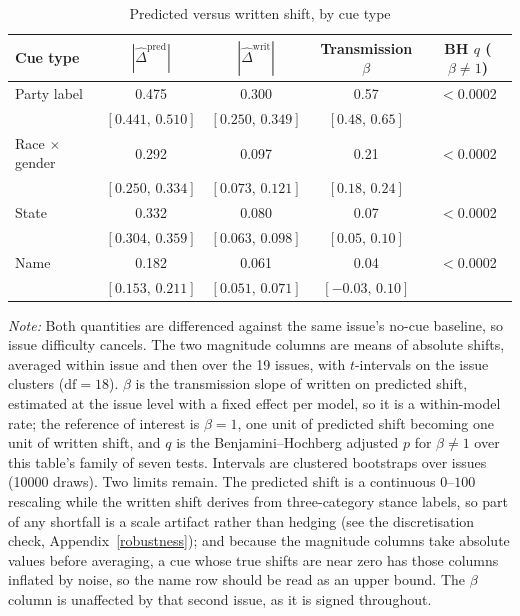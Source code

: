 \begin{table}[H]
\centering
\caption{Predicted versus written shift, by cue type}
\label{tab:predwrite}
\small
\setlength{\tabcolsep}{9pt}
\begin{tabular}{lcccc}
\toprule
\textbf{Cue type} & $|\widehat{\Delta}^{\text{pred}}|$ & $|\widehat{\Delta}^{\text{writ}}|$ & \textbf{Transmission} $\beta$ & BH $q$ ($\beta \neq 1$) \\
\midrule
Party label & 0.475 & 0.300 & 0.57 & $<$0.0002 \\
 & \scriptsize $[0.441,\,0.510]$ & \scriptsize $[0.250,\,0.349]$ & \scriptsize $[0.48,\,0.65]$ & \\
\addlinespace[2pt]
Race $\times$ gender & 0.292 & 0.097 & 0.21 & $<$0.0002 \\
 & \scriptsize $[0.250,\,0.334]$ & \scriptsize $[0.073,\,0.121]$ & \scriptsize $[0.18,\,0.24]$ & \\
\addlinespace[2pt]
State & 0.332 & 0.080 & 0.07 & $<$0.0002 \\
 & \scriptsize $[0.304,\,0.359]$ & \scriptsize $[0.063,\,0.098]$ & \scriptsize $[0.05,\,0.10]$ & \\
\addlinespace[2pt]
Name & 0.182 & 0.061 & 0.04 & $<$0.0002 \\
 & \scriptsize $[0.153,\,0.211]$ & \scriptsize $[0.051,\,0.071]$ & \scriptsize $[-0.03,\,0.10]$ & \\
\bottomrule
\end{tabular}

\vspace{3pt}
\begin{minipage}{0.94\linewidth}
\footnotesize\textit{Note:} Both quantities are differenced against the same issue's no-cue baseline, so issue difficulty cancels. The two magnitude columns are means of absolute shifts, averaged within issue and then over the 19 issues, with $t$-intervals on the issue clusters ($\mathrm{df}=18$). $\beta$ is the transmission slope of written on predicted shift, estimated at the issue level with a fixed effect per model, so it is a within-model rate; the reference of interest is $\beta = 1$, one unit of predicted shift becoming one unit of written shift, and $q$ is the Benjamini--Hochberg adjusted $p$ for $\beta \neq 1$ over this table's family of seven tests. Intervals are clustered bootstraps over issues (10000 draws). Two limits remain. The predicted shift is a continuous $0$--$100$ rescaling while the written shift derives from three-category stance labels, so part of any shortfall is a scale artifact rather than hedging (see the discretisation check, Appendix~\ref{robustness}); and because the magnitude columns take absolute values before averaging, a cue whose true shifts are near zero has those columns inflated by noise, so the name row should be read as an upper bound. The $\beta$ column is unaffected by that second issue, as it is signed throughout.
\end{minipage}
\end{table}

